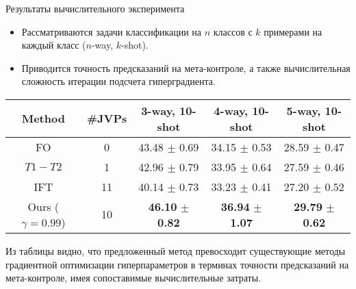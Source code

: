 \documentclass[aspectratio=169]{beamer}
\begin{document}
\begin{frame}{Результаты вычислительного эксперимента}
  \begin{itemize}
    \item Рассматриваются задачи классификации на $n$ классов с $k$ примерами на каждый класс ($n$-way, $k$-shot).
    \item  Приводится точность предсказаний на мета-контроле,
    а также вычислительная сложность итерации подсчета гиперградиента.
  \end{itemize}
  \begin{table}
    \centering
    \begin{tabular}{c|c|ccc}
    \toprule
    \textbf{Method} & \textbf{\#JVPs} & \textbf{3-way, 10-shot} & \textbf{4-way, 10-shot} & \textbf{5-way, 10-shot} \\ \midrule
    FO & 0 & 43.48 $\pm$ 0.69 & 34.15 $\pm$ 0.53 & 28.59 $\pm$ 0.47 \\
    $T1-T2$ & 1 & 42.96 $\pm$ 0.79 & 33.95 $\pm$ 0.64 & 27.59 $\pm$ 0.46 \\
    IFT & 11 & 40.14 $\pm$ 0.73 & 33.23 $\pm$ 0.41 & 27.20 $\pm$ 0.52 \\
    Ours ($\gamma = 0.99$) & 10 & \textbf{46.10} $\pm$ \textbf{0.82} & \textbf{36.94} $\pm$ \textbf{1.07} & \textbf{29.79} $\pm$ \textbf{0.62} \\ \bottomrule
    \end{tabular}
  \end{table}
Из таблицы видно, что предложенный метод превосходит существующие методы градиентной оптимизации гиперпараметров в терминах 
точности предсказаний на мета-контроле, имея сопоставимые вычислительные затраты.
  
\end{frame}
\end{document}
